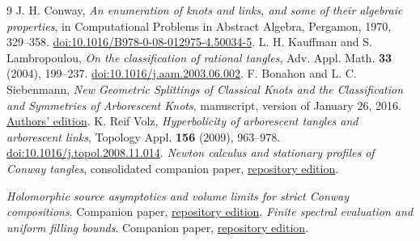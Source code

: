 \documentclass[11pt]{article}
\numberwithin{equation}{section}
\theoremstyle{definition}\newtheorem{definition}[theorem]{Definition}
\theoremstyle{remark}\newtheorem{remark}[theorem]{Remark}
\begin{document}
\begin{thebibliography}{9}
 J. H. Conway, \emph{An enumeration of knots and links, and some of their algebraic properties}, in Computational Problems in Abstract Algebra, Pergamon, 1970, 329--358. \href{https://doi.org/10.1016/B978-0-08-012975-4.50034-5}{doi:10.1016/B978-0-08-012975-4.50034-5}.
 L. H. Kauffman and S. Lambropoulou, \emph{On the classification of rational tangles}, Adv. Appl. Math. \textbf{33} (2004), 199--237. \href{https://doi.org/10.1016/j.aam.2003.06.002}{doi:10.1016/j.aam.2003.06.002}.
 F. Bonahon and L. C. Siebenmann, \emph{New Geometric Splittings of Classical Knots and the Classification and Symmetries of Arborescent Knots}, manuscript, version of January 26, 2016. \href{https://dornsife.usc.edu/francis-bonahon/wp-content/uploads/sites/205/2023/06/BonSieb-compressed.pdf}{Authors' edition}.
 K. Reif Volz, \emph{Hyperbolicity of arborescent tangles and arborescent links}, Topology Appl. \textbf{156} (2009), 963--978. \href{https://doi.org/10.1016/j.topol.2008.11.014}{doi:10.1016/j.topol.2008.11.014}.
\emph{Newton calculus and stationary profiles of Conway tangles},
consolidated companion paper,
\href{https://sashakolpakov.github.io/murakamis_dream/papers/newton-calculus.pdf}{repository edition}.

 \emph{Holomorphic source asymptotics and volume limits for strict Conway compositions}. Companion paper, \href{https://sashakolpakov.github.io/murakamis_dream/papers/conway-asymptotics.pdf}{repository edition}.
 \emph{Finite spectral evaluation and uniform filling bounds}. Companion paper, \href{https://sashakolpakov.github.io/murakamis_dream/papers/filling-bounds.pdf}{repository edition}.
\end{thebibliography}
\end{document}
